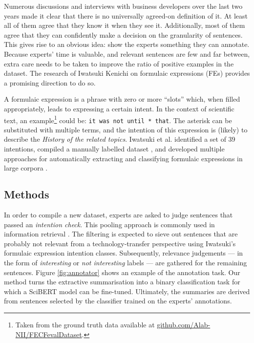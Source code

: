 Numerous discussions and interviews with business developers over the last two years made it clear that there is no universally agreed-on definition of it. At least all of them agree that they know it when they see it. Additionally, most of them agree that they can confidently make a decision on the granularity of sentences. This gives rise to an obvious idea: show the experts something they can annotate. Because experts' time is valuable, and relevant sentences are few and far between, extra care needs to be taken to improve the ratio of positive examples in the dataset. The research of Iwatsuki Kenichi on formulaic expressions (FEs) \cite{iwatsuki2020evaluation,iwatsuki2021extraction,iwatsuki2021communicative,iwatsuki2022extraction} provides a promising direction to do so. 

A formulaic expression is a phrase with zero or more ``slots'' which, when filled appropriately, leads to expressing a certain intent. In the context of scientific text, an example\footnote{Taken from the ground truth data available at \href{https://github.com/Alab-NII/FECFevalDataset/blob/master/human_evaluation/background.tsv}{github.com/Alab-NII/FECFevalDataset}.} could be: \texttt{it was not until * that}. The asterisk can be substituted with multiple terms, and the intention of this expression is (likely) to describe the \textit{History of the related topics}. Iwatsuki et al. identified a set of 39 intentions, compiled a manually labelled dataset \cite{iwatsuki2020evaluation}, and developed multiple approaches for automatically extracting and classifying formulaic expressions in large corpora \cite{iwatsuki2021communicative,iwatsuki2022extraction}.

\subsection{Methods}

In order to compile a new dataset, experts are asked to judge sentences that passed an \textit{intention check}. This pooling approach is commonly used in information retrieval \cite{schutze2008introduction}. The filtering is expected to sieve out sentences that are probably not relevant from a technology-transfer perspective using Iwatsuki's formulaic expression intention classes. Subsequently, relevance judgements --- in the form of \textit{interesting} or \textit{not interesting} labels --- are gathered for the remaining sentences. Figure \ref{fig:annotator} shows an example of the annotation task. Our method turns the extractive summarisation into a binary classification task for which a SciBERT model \cite{beltagy2019scibert} can be fine-tuned. Ultimately, the summaries are derived from sentences selected by the classifier trained on the experts' annotations. 

